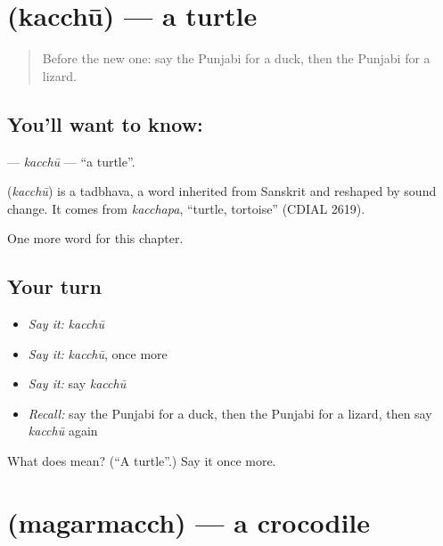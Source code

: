 \section[\texorpdfstring{\pa{ਕੱਛੂ} (kacchū)}{ਕੱਛੂ (kacchū)}]{ (kacchū) — a turtle}

\label{lesson:PA-C131-kacchu}



\begin{quote}
Before the new one: say the Punjabi for a duck, then the Punjabi for a lizard.
\end{quote}

\subsection*{You'll want to know: }
\textbf{} — \emph{kacchū} — \textquotedblleft{}a turtle\textquotedblright{}.

\begin{cousinweb}
\textbf{} (\emph{kacchū}) is a tadbhava, a word inherited from Sanskrit and reshaped by sound change. It comes from \emph{kacchapa}, \textquotedblleft{}turtle, tortoise\textquotedblright{} (CDIAL 2619).
\end{cousinweb}

\begin{grammarlens}[title={What you've built}]
One more word for this chapter.
\end{grammarlens}

\subsection*{Your turn}
\begin{itemize}
\raggedright
  \item \emph{Say it:} \emph{kacchū}
  \item \emph{Say it:} \emph{kacchū}, once more
  \item \emph{Say it:} say \emph{kacchū}
  \item \emph{Recall:} say the Punjabi for a duck, then the Punjabi for a lizard, then say \emph{kacchū} again
\end{itemize}

\begin{tcolorbox}[breakable,colback=teal!4,colframe=teal!35!black,title={Before you move on}]
What does  mean? (\textquotedblleft{}A turtle\textquotedblright{}.) Say it once more.
\end{tcolorbox}
\section[\texorpdfstring{\pa{ਮਗਰਮੱਛ} (magarmacch)}{ਮਗਰਮੱਛ (magarmacch)}]{ (magarmacch) — a crocodile}

